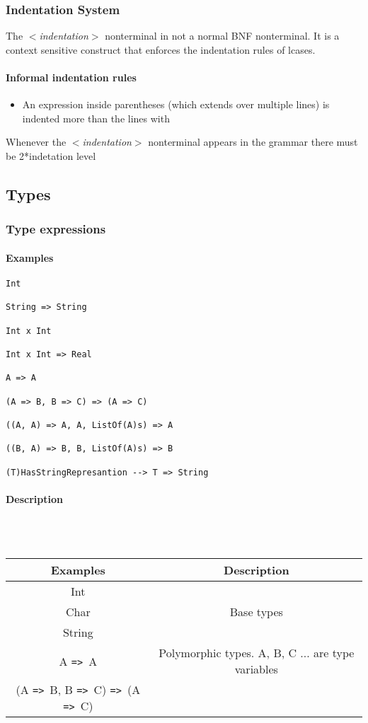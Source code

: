 \documentclass{article}
\def\ra{\texttt{=>}\ }
\def\pend{\mbox{} \\\\}
\begin{document}
\subsubsection{Indentation System}
\label{subsubsec:indsys}

The \textit{$<$indentation$>$} nonterminal in not a normal BNF nonterminal. It is a
context sensitive construct that enforces the indentation rules of lcases.

\paragraph{Informal indentation rules}
\begin{itemize}

\item
An expression inside parentheses (which extends over multiple lines)
is indented more than the lines with

\end{itemize}

Whenever
the \textit{$<$indentation$>$} nonterminal appears in the grammar there must be
2*indetation level


\subsection{Types}
\label{subsec:types}

\subsubsection{Type expressions}

\paragraph{Examples}

\begin{verbatim}
Int

String => String 

Int x Int 

Int x Int => Real

A => A

(A => B, B => C) => (A => C)

((A, A) => A, A, ListOf(A)s) => A

((B, A) => B, B, ListOf(A)s) => B

(T)HasStringRepresantion --> T => String
\end{verbatim}

\paragraph{Description}\pend
\begin{tabular}{ |c|c| } 
\hline
Examples & Description \\ 
\hline
\hline
Int & \\
Char & Base types \\
String & \\ 
\hline
A \ra A &
Polymorphic types. A, B, C ... are type variables
\\
(A \ra B, B \ra C) \ra (A \ra C) &
\\ 
\hline
\end{tabular}
\end{document}
